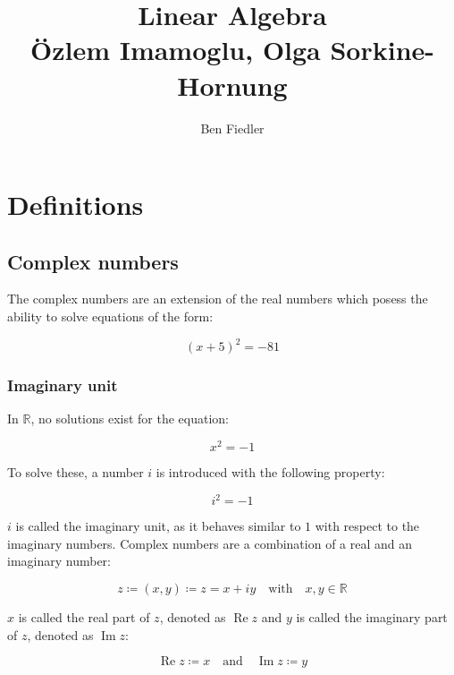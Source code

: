 \documentclass[a4paper,12pt]{article}
\newcommand{\uniti}{i}
\newcommand{\defas}{\coloneqq}
\renewcommand{\Re}[1]{\operatorname{Re}{#1}}
\renewcommand{\Im}[1]{\operatorname{Im}{#1}}
\newcommand{\R}{\mathbb{R}}
\theoremstyle{plain}
\numberwithin{equation}{section}
\begin{document}
\author{Ben Fiedler}
\title{Linear Algebra \\
       \large{Özlem Imamoglu, Olga Sorkine-Hornung}}
\date{ }

\maketitle
\tableofcontents

\newpage

\section{Definitions}

\subsection{Complex numbers}

The complex numbers are an extension of the real numbers which posess the ability to
solve equations of the form:

$$ (x + 5) ^ 2 = -81 $$

\subsubsection{Imaginary unit}

In $\R$, no solutions exist for the equation:

\begin{equation}
    x^2 = {-1}
\end{equation}

To solve these, a number $\uniti$ is introduced with the following property:

\begin{equation}
    \uniti^2 = {-1}
\end{equation}

$\uniti$ is called the imaginary unit, as it behaves similar to $1$ with respect to
the imaginary numbers. Complex numbers are a combination of a real and an imaginary number:

\begin{equation}
    z \defas (x, y) \defas z = x + \uniti y \quad \text{with} \quad x, y \in \R
\end{equation}

$x$ is called the real part of $z$, denoted as $\Re{z}$ and $y$ is called the
imaginary part of $z$, denoted as $\Im{z}$:

$$ \Re{z} \defas x \quad \text{and} \quad \Im{z} \defas y $$
\end{document}

